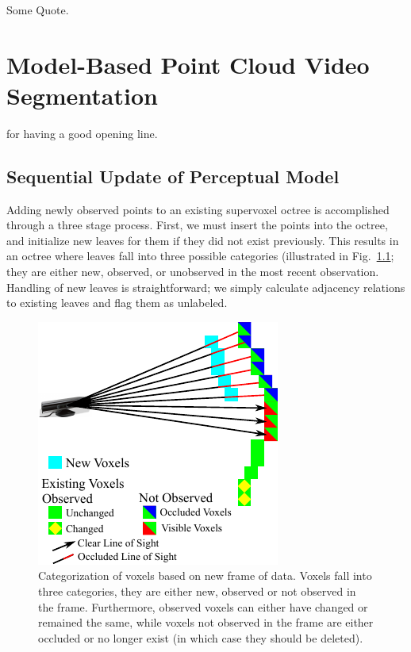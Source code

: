\begin{savequote}[75mm]
Some Quote.
\end{savequote}


\chapter{Model-Based Point Cloud Video Segmentation}
 for having a good opening line. 
\section{Sequential Update of Perceptual Model}
Adding newly observed points to an existing supervoxel octree is accomplished through a three stage process. First, we must insert the points into the octree, and initialize new leaves for them if they did not exist previously. This results in an octree where leaves fall into three possible categories (illustrated in Fig.~\ref{fig:VoxelVisibility}; they are either new, observed, or unobserved in the most recent observation. Handling of new leaves is straightforward; we simply calculate adjacency relations to existing leaves and flag them as unlabeled. 
\begin{figure}[tb]
  \centering
  \includegraphics[scale=1.2]{figures/IROS2013/VoxelVisibility.pdf}
  \caption[Voxel Visibility]{Categorization of voxels based on new frame of data. Voxels fall into three categories, they are either new, observed or not observed in the frame. Furthermore, observed voxels can either have changed or remained the same, while voxels not observed in the frame are either occluded or no longer exist (in which case they should be deleted).}
  \label{fig:VoxelVisibility}
\end{figure}

